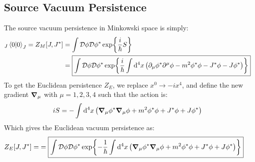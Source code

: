 \documentclass[12pt]{article}
\newcommand{\cD}{\mathcal{D}}
\newcommand{\D}{\partial}
\newcommand{\phis}{\phi^*}
\begin{document}
\subsection{Source Vacuum Persistence}
The source vacuum persistence in Minkowski space is simply:
\begin{align*}
  _J\ip{0}{0}_J=Z_M[J,J^*]&=\int\cD\phi\cD\phi^*\exp{\frac{i}{\hbar}S}\\
  &=\boxed{\int\cD\phi\cD\phi^*\exp{\frac{i}{\hbar}
    \int\dd[4]{x}\qty(\D_\mu\phi^*\D^\mu\phi-m^2\phi^*\phi-J^*\phi-J\phi^*)}}
\end{align*}
To get the Euclidean persistence $Z_E$, we replace $x^0\to -ix^4$, and define the new gradient $\grad_\mu$ with $\mu=1,2,3,4$ such that the action is:
\begin{align*}
  iS=-\int\dd[4]{x}\qty(\grad_\mu\phis\grad_\mu\phi+m^2\phis\phi+J^*\phi+J\phis)
\end{align*}
Which gives the Euclidean vacuum persistence as:
\begin{align*}
  Z_E[J,J^*]=&=\boxed{\int\cD\phi\cD\phi^*\exp{-\frac{1}{\hbar}
    \int\dd[4]{x}\qty(\grad_\mu\phis\grad_\mu\phi+m^2\phis\phi+J^*\phi+J\phis)}}
\end{align*}
\end{document}
